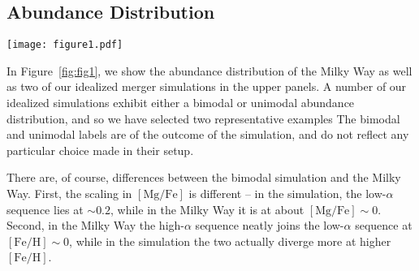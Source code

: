 \documentclass[twocolumn,linenumbers,trackchanges]{aastex631}
\newcommand{\kms}{\ensuremath{\textrm{km}/\textrm{s}}}
\newcommand{\FeH}{\ensuremath{[\textrm{Fe}/\textrm{H}]}}
\newcommand{\MgFe}{\ensuremath{[\textrm{Mg}/\textrm{Fe}]}}
\newcommand{\dex}{\ensuremath{\textrm{dex}}}
\begin{document}
\subsection{Abundance Distribution}\label{ssec:abundplane}
\begin{figure*}
  \centering
  \texttt{[image: figure1.pdf]}
  \caption{The abundance bimodality seen in the Milky Way can be reproduced in some idealized merger simulations. In the upper panels, we show the distribution of stars in the \MgFe{}-\FeH{} plane. The lower panels show the distribution of \MgFe{} at a fixed \FeH{} bin of width $0.05\,\dex$. The colors indicate the fixed \FeH values, which are $-0.5$, $-0.25$, $0$, and $0.25$. The left column shows the observed distribution in the Milky Way from ASPCAP DR17 \citep[][J.A.~Holtzman et al., in preparation]{2016AJ....151..144G}, while the right two columns show two idealized merger simulations. The idealized merger simulations are nearly identical, except that in the bimodal simulation the satellite has a starting \edit1{velocity of $142\,\kms$}, while in the unimodal simulation it has a starting \edit1{velocity of $116\,\kms$}. The labels ``unimodal'' and ``bimodal'' are of the \textit{outcome} of the simulation, and do not reflect a particular choice in the setup. The Milky Way (left column) exhibits a strong bimodal distribution of \MgFe{} at various \FeH{}. The idealized merger simulation marked as bimodal (center column) also exhibits a bimodal distribution of \MgFe{}, though the structure is not as strongly defined. The idealized merger simulation marked as unimodal (right column) exhibits only weak structure, if any at all.}
  \label{fig:fig1}
\end{figure*}

In Figure~\ref{fig:fig1}, we show the abundance distribution of the Milky Way as well as two of our idealized merger simulations in the upper panels. A number of our idealized simulations exhibit either a bimodal or unimodal abundance distribution, and so we have selected two representative examples  The bimodal and unimodal labels are of the outcome of the simulation, and do not reflect any particular choice made in their setup.

There are, of course, differences between the bimodal simulation and the Milky Way. First, the scaling in \MgFe{} is different -- in the simulation, the low-$\alpha$ sequence lies at $\sim0.2$, while in the Milky Way it is at about $\MgFe\sim0$. Second, in the Milky Way the high-$\alpha$ sequence neatly joins the low-$\alpha$ sequence at $\FeH\sim0$, while in the simulation the two actually diverge more at higher \FeH{}.
\end{document}
